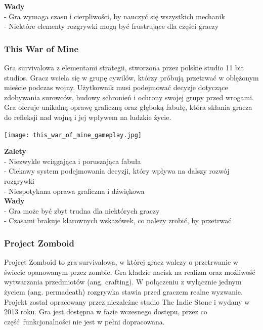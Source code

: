 \documentclass{article}
\begin{document}
\textbf{Wady} \\
- Gra wymaga czasu i cierpliwości, by nauczyć się wszystkich mechanik\\
- Niektóre elementy rozgrywki mogą być frustrujące dla części graczy \\

\newpage
\subsubsection{This War of Mine \cite{game:twom}}
Gra survivalowa z elementami strategii, stworzona przez polskie studio 11 bit studios. Gracz wciela się w grupę cywilów, którzy próbują przetrwać w oblężonym mieście podczas wojny. Użytkownik musi podejmować decyzje dotyczące zdobywania surowców, budowy schronień i ochrony swojej grupy przed wrogami. Gra oferuje unikalną oprawę graficzną oraz głęboką fabułę, która skłania gracza do refleksji nad wojną i jej wpływem na ludzkie życie.

\begin{center}
     \texttt{[image: this\_war\_of\_mine\_gameplay.jpg]}
\end{center}

\textbf{Zalety} \\
- Niezwykle wciągająca i poruszająca fabuła \\
- Ciekawy system podejmowania decyzji, który wpływa na dalszy rozwój rozgrywki\\
- Niespotykana oprawa graficzna i dźwiękowa\\

\textbf{Wady} \\
- Gra może być zbyt trudna dla niektórych graczy\\
- Czasami brakuje klarownych wskazówek, co należy zrobić, by przetrwać\\

\newpage
\subsubsection{Project Zomboid \cite{game:pz}}
Project Zomboid to gra survivalowa, w której gracz walczy o przetrwanie w świecie opanowanym przez zombie. Gra kładzie nacisk na realizm oraz możliwość wytwarzania przedmiotów (ang. crafting). W połączeniu z wyłącznie jednym życiem (ang. permadeath) rozgrywka stawia przed graczem realne wyzwanie. Projekt został opracowany przez niezależne studio The Indie Stone i wydany w 2013 roku. Gra jest dostępna w fazie wczesnego dostępu, przez co część funkcjonalności nie jest w pełni dopracowana.
\end{document}
